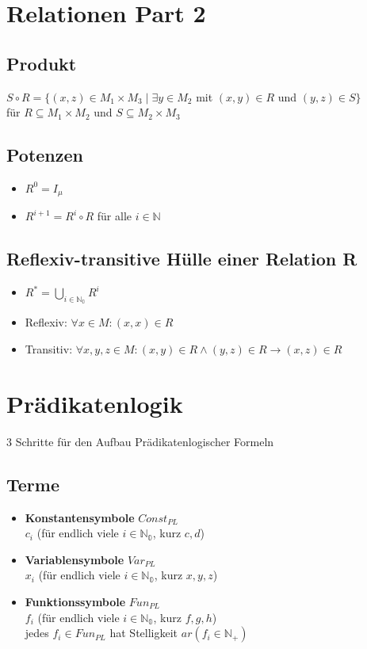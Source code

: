 \documentclass[a4paper,portrait]{scrartcl}
\begin{document}
\section{Relationen Part 2}
\subsection{Produkt}
$S \circ R = \lbrace (x,z) \in M_{1} \times M_{3} \mid \exists y \in M_{2}$ mit $(x,y) \in R$ und $(y,z) \in S \rbrace$ \\
für $R \subseteq M_{1} \times M_{2}$ und $S \subseteq M_{2} \times M_{3}$
\subsection{Potenzen}
\begin{itemize}
\item $R^{0} = I_{\mu}$
\item $R^{i+1} = R^{i} \circ R$ für alle $i \in \mathbb{N}$ 
\end{itemize}
\subsection{Reflexiv-transitive Hülle einer Relation R}
\begin{itemize}
\item $R^{*} = \bigcup\limits_{i \in \mathbb{N_{0}}}R^{i}$
\item Reflexiv: $\forall x \in M: (x,x) \in R$
\item Transitiv: $\forall x,y,z \in M: (x,y) \in R \wedge (y,z) \in R \rightarrow (x,z) \in R$
\end{itemize}
\section{Prädikatenlogik}
3 Schritte für den Aufbau Prädikatenlogischer Formeln
\subsection{Terme}
\begin{itemize}
\item \textbf{Konstantensymbole} $Const_{PL}$ \\
$c_{i}$ (für endlich viele $i \in \mathbb{N_{0}}$, kurz $c,d$)
\item \textbf{Variablensymbole} $Var_{PL}$ \\
$x_{i}$ (für endlich viele $i \in \mathbb{N_{0}}$, kurz $x,y,z$)
\item \textbf{Funktionssymbole} $Fun_{PL}$ \\
$f_{i}$ (für endlich viele $i \in \mathbb{N_{0}}$, kurz $f,g,h$) \\
jedes $f_{i} \in Fun_{PL}$ hat Stelligkeit $ar(f_{i} \in \mathbb{N_{+}})$
\end{itemize}
\end{document}
